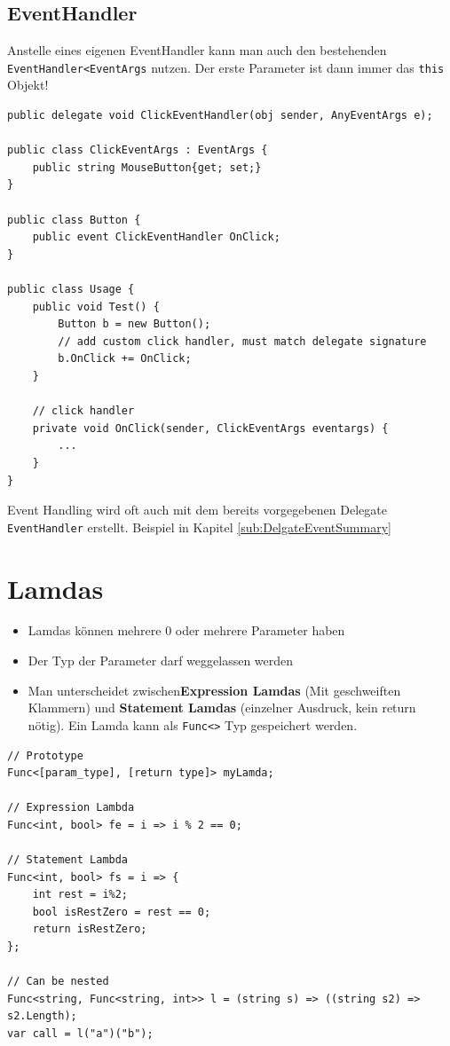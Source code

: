 \subsection{EventHandler}
Anstelle eines eigenen EventHandler kann man auch den bestehenden \lstinline|EventHandler<EventArgs| nutzen. Der erste Parameter ist dann immer das \lstinline|this| Objekt!
\begin{lstlisting}[caption=C\# Event Handler]
public delegate void ClickEventHandler(obj sender, AnyEventArgs e);

public class ClickEventArgs : EventArgs {
	public string MouseButton{get; set;}
}

public class Button {
	public event ClickEventHandler OnClick;
}

public class Usage {
	public void Test() {
		Button b = new Button();
		// add custom click handler, must match delegate signature
		b.OnClick += OnClick;
	}
	
	// click handler
	private void OnClick(sender, ClickEventArgs eventargs) {
		...
	}
}
\end{lstlisting}
Event Handling wird oft auch mit dem bereits vorgegebenen Delegate \lstinline|EventHandler| erstellt. Beispiel in Kapitel \ref{sub:DelgateEventSummary}

\section{Lamdas}
\begin{itemize}
	\item Lamdas können mehrere 0 oder mehrere Parameter haben
	\item Der Typ der Parameter darf weggelassen werden
	\item Man unterscheidet zwischen\textbf{Expression Lamdas} (Mit geschweiften Klammern) und \textbf{Statement Lamdas} (einzelner Ausdruck, kein return nötig). Ein Lamda kann als \lstinline|Func<>| Typ gespeichert werden. 
\end{itemize}

\begin{lstlisting}
// Prototype
Func<[param_type], [return type]> myLamda;

// Expression Lambda
Func<int, bool> fe = i => i % 2 == 0;

// Statement Lambda
Func<int, bool> fs = i => {
	int rest = i%2;
	bool isRestZero = rest == 0;
	return isRestZero;
};

// Can be nested
Func<string, Func<string, int>> l = (string s) => ((string s2) => s2.Length);
var call = l("a")("b");
\end{lstlisting}


